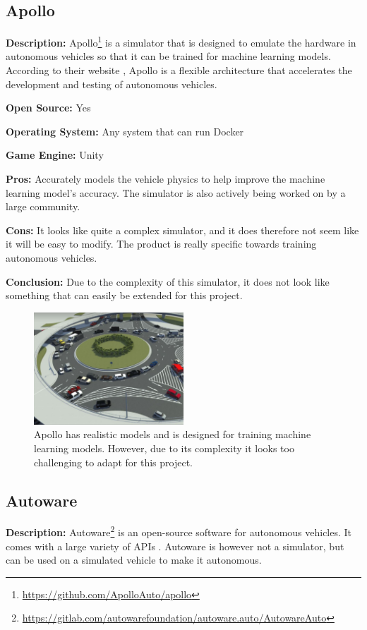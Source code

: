 \subsection{Apollo} \label{Apollo}
\textbf{Description:} Apollo\footnote{\url{https://github.com/ApolloAuto/apollo}} is a simulator that is designed to emulate the hardware in autonomous vehicles so that it can be trained for machine learning models. According to their website \cite{Apollo_Website}, Apollo is a flexible architecture that accelerates the development and testing of autonomous vehicles.

\textbf{Open Source:} Yes

\textbf{Operating System:} Any system that can run Docker

\textbf{Game Engine:} Unity

\textbf{Pros:} Accurately models the vehicle physics to help improve the machine learning model's accuracy. The simulator is also actively being worked on by a large community.  

\textbf{Cons:} It looks like quite a complex simulator, and it does therefore not seem like it will be easy to modify. The product is really specific towards training autonomous vehicles. 

\textbf{Conclusion:} Due to the complexity of this simulator, it does not look like something that can easily be extended for this project. 

\begin{figure}[H]
    \centering
    \includegraphics[width=0.5\textwidth]{03_Background/Appendix/Simulators/Apollo.JPG}
    \caption{Apollo has realistic models and is designed for training machine learning models. However, due to its complexity it looks too challenging to adapt for this project.}
\end{figure}

\subsection{Autoware} \label{Autoware}
\textbf{Description:} Autoware\footnote{\url{https://gitlab.com/autowarefoundation/autoware.auto/AutowareAuto}} is an open-source software for autonomous vehicles. It comes with a large variety of APIs  \cite{Autoware_doc_Website}. Autoware is however not a simulator, but can be used on a simulated vehicle to make it autonomous.

